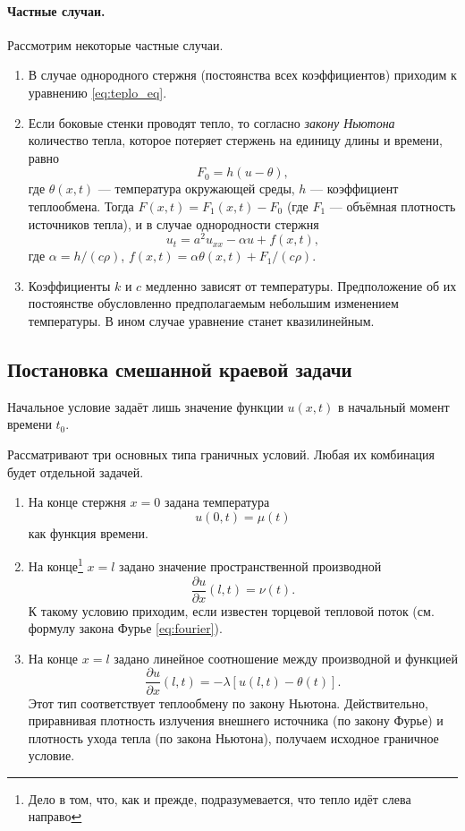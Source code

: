 \paragraph{Частные случаи.} Рассмотрим некоторые частные случаи.
\begin{enumerate}
  \item В случае однородного
стержня (постоянства всех коэффициентов) приходим к уравнению
\eqref{eq:teplo_eq}.

 \item Если боковые стенки проводят тепло, то согласно \emph{закону Ньютона}
количество тепла, которое потеряет стержень на единицу длины и времени, равно 
\[
    F_0 = h(u - \theta),
\]
где $ \theta(x, t) $ --- температура окружающей среды, $ h $ --- коэффициент
теплообмена. Тогда $ F(x, t) = F_1(x, t) - F_0 $ (где $ F_1 $ --- объёмная
плотность источников тепла), и в случае однородности
стержня 
\[
  u_t = a^2 u_{xx} - \alpha u + f(x, t),
\]
где $ \alpha = h/(c\rho) $, $ f(x, t) = \alpha\theta(x, t) + F_1/(c\rho) $.

\item  Коэффициенты $ k $ и $ c $ медленно зависят от температуры. Предположение об
их постоянстве обусловленно предполагаемым небольшим изменением температуры.
В ином случае уравнение станет квазилинейным.
\end{enumerate}

\subsection*{Постановка смешанной краевой задачи}
Начальное условие задаёт лишь значение функции $ u(x, t) $ в начальный момент
времени $ t_0 $.

Рассматривают три основных типа граничных условий. Любая их комбинация будет
отдельной задачей.
\begin{enumerate}
  \item На конце стержня $ x = 0 $ задана
    температура  
    \[
        u(0, t) = \mu(t)
    \]
    как функция времени.
  \item На конце\footnote{Дело в том, что, как и прежде, подразумевается, что
    тепло идёт слева направо} $ x = l $ задано значение пространственной производной 
  \[
      \frac{\partial u}{\partial x}(l, t) = \nu(t).
  \]
  К такому условию приходим, если известен торцевой тепловой поток (см. формулу
  закона Фурье
  \eqref{eq:fourier}).
\item На конце $ x = l $ задано линейное соотношение между производной и функцией 
\[
  \frac{\partial u}{\partial x}(l, t) = -\lambda [u(l, t) - \theta(t)].
\]
Этот тип соответствует теплообмену по закону Ньютона. Действительно, приравнивая
плотность излучения внешнего источника (по закону Фурье) и плотность ухода тепла
(по закона Ньютона), получаем исходное граничное условие.
\end{enumerate}

